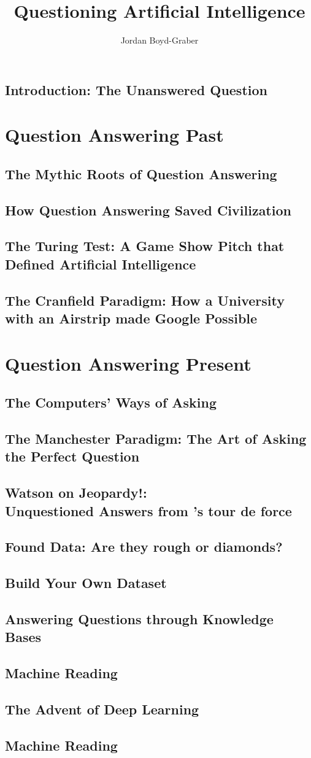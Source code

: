 \documentclass[bfivepaper,twosided,justified,nobib]{style/tufte-book}
\title{Questioning Artificial Intelligence}
\author{Jordan Boyd-Graber}
\newif\ifproposal\proposalfalse
\newcommand{\proposalpart}[1]{
  \ifproposal
  \subsection{#1}
  \else
  \part{#1}
  \fi
}
\newcommand{\chapterfile}[3]{
  \ifproposal
  \paragraph{#3}
  
  \else
  \chapter{#3}
  \label{ch:#1}
  \begin{quote}
    
  \end{quote}
  
  \fi}
\begin{document}
\setcounter{secnumdepth}{0}










\chapterfile{010}{introduction}{Introduction: The Unanswered Question}

\ifproposal

\fi


\ifproposal

\else

\tableofcontents



\clearpage


\proposalpart{Question Answering Past}


\chapterfile{110}{epic}{The Mythic Roots of Question Answering}

\chapterfile{120}{civilization}{How Question Answering Saved Civilization}





\chapterfile{130}{turing}{The Turing Test: A Game Show Pitch that
  Defined Artificial Intelligence}

\chapterfile{140}{ir}{The Cranfield Paradigm: How a University with an
  Airstrip made Google Possible}

\proposalpart{Question Answering Present}

\chapterfile{200}{formats}{The Computers' Ways of Asking}

\chapterfile{240}{qb}{The Manchester Paradigm: The Art of Asking the
  Perfect Question}
\fi

\chapterfile{250}{watson}{Watson on Jeopardy!: \\ Unquestioned Answers from \abr{ibm}'s tour de force}

  \ifproposal

  \else
  
\chapterfile{260}{datasets_found}{Found  Data: Are they rough
  or diamonds?}
\chapterfile{262}{datasets_constructed}{Build Your Own Dataset}

\chapterfile{270}{methods_kb}{Answering Questions through Knowledge
  Bases}
\chapterfile{271}{methods_mr}{Machine Reading}
\chapterfile{272}{methods_deep_retrieval}{The Advent of Deep Learning}
\chapterfile{273}{methods_generation}{Machine Reading}
\end{document}
